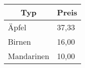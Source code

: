 \documentclass{article}
\begin{document}
  \begin{tabular}{|ll|}
      \hline
      \multicolumn{1}{|c}{
        \textbf{Typ}
      }
      & \multicolumn{1}{c|}{
        \textbf{Preis}
      } \\
      \hline
      Äpfel & 37,33 \\
      Birnen & 16,00 \\
      Mandarinen & 10,00 \\
      \hline
  \end{tabular}
\end{document}
